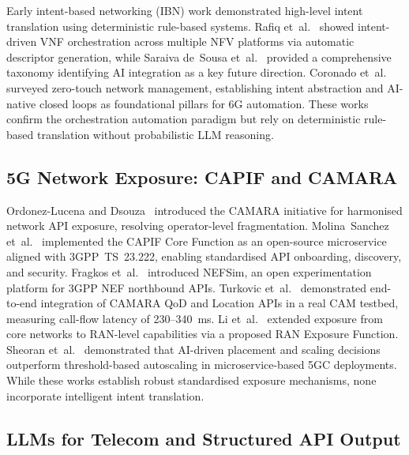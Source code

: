 \documentclass[conference]{IEEEtran}
\begin{document}
Early intent-based networking (IBN) work demonstrated high-level intent
translation using deterministic rule-based systems. Rafiq et~al.~\cite{rafiq2020}
showed intent-driven VNF orchestration across multiple NFV platforms via
automatic descriptor generation, while Saraiva de~Sousa et~al.~\cite{saraiva2019}
provided a comprehensive taxonomy identifying AI integration as a key future
direction. Coronado et~al.~\cite{coronado2022} surveyed zero-touch network
management, establishing intent abstraction and AI-native closed loops as
foundational pillars for 6G automation. These works confirm the orchestration
automation paradigm but rely on deterministic rule-based translation without
probabilistic LLM reasoning.

\subsection{5G Network Exposure: CAPIF and CAMARA}

Ordonez-Lucena and Dsouza~\cite{camara2022} introduced the CAMARA initiative
for harmonised network API exposure, resolving operator-level fragmentation.
Molina~Sanchez et~al.~\cite{molina2022} implemented the CAPIF Core Function
as an open-source microservice aligned with 3GPP~TS~23.222, enabling standardised
API onboarding, discovery, and security. Fragkos et~al.~\cite{nefsim2022}
introduced NEFSim, an open experimentation platform for 3GPP NEF northbound
APIs. Turkovic et~al.~\cite{turkovic2025} demonstrated end-to-end integration
of CAMARA QoD and Location APIs in a real CAM testbed, measuring call-flow
latency of 230--340~ms. Li et~al.~\cite{li2025} extended exposure from core
networks to RAN-level capabilities via a proposed RAN Exposure Function.
Sheoran et~al.~\cite{sheoran2021} demonstrated that AI-driven placement and
scaling decisions outperform threshold-based autoscaling in microservice-based
5GC deployments. While these works establish robust standardised exposure
mechanisms, none incorporate intelligent intent translation.

\subsection{LLMs for Telecom and Structured API Output}
\end{document}
